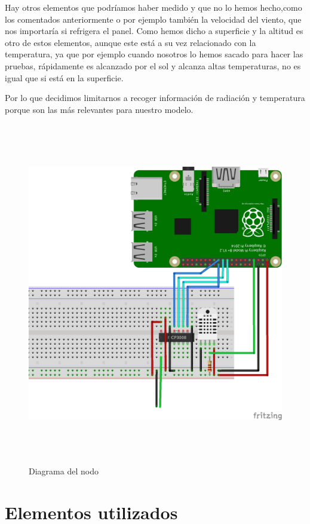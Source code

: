 Hay otros elementos que podríamos haber medido y que no lo hemos hecho,como los comentados anteriormente o por ejemplo también la velocidad del viento, que nos importaría si refrigera el panel.
Como hemos dicho a superficie y la altitud es otro de estos elementos, aunque este está a su vez relacionado con la temperatura, ya que por ejemplo cuando nosotros lo hemos sacado para hacer las pruebas, rápidamente es alcanzado por el sol y alcanza altas temperaturas, no es igual que si está en la superficie.

Por lo que decidimos limitarnos a recoger información de radiación y temperatura porque son las más relevantes para nuestro modelo.


\begin{figure}[htb]
	
	\begin{center}
		\includegraphics[width=15cm,height=15cm]{figures/solar_project_node_diagram.png}
		\caption{Diagrama del nodo}
	\end{center}
	
	\label{figure2}
\end{figure}

\section{Elementos utilizados}
\label{makereference4.2}
